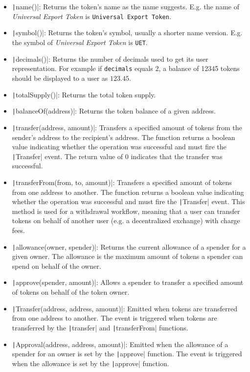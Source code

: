 \begin{itemize}
   \item \texttt|name()|: Returns the token's name as the name suggests. E.g. the name of \textit{Universal Export Token} is \texttt{Universal Export Token}.
   \item \texttt|symbol()|: Returns the token's symbol, usually a shorter name version. E.g. the symbol of \textit{Universal Export Token} is \texttt{UET}.
   \item \texttt|decimals()|: Returns the number of decimals used to get its user representation. For example if \texttt{decimals} equals $2$, a balance of 12345 tokens should be displayed to a user as $123.45$.
   \item \texttt|totalSupply()|: Returns the total token supply.
   \item \texttt|balanceOf(address)|: Returns the token balance of a given address.
   \item \texttt|transfer(address, amount)|: Transfers a specified amount of tokens from the sender's address to the recipient's address. The function returns a boolean
         value indicating whether the operation was successful and must fire the \texttt|Transfer| event. The return value of 0 indicates that the transfer was successful.
   \item \texttt|transferFrom(from, to, amount)|: Transfers a specified amount of tokens from one address to another. The function returns a boolean value
         indicating whether the operation was successful and must fire the \texttt|Transfer| event. This method is used for a withdrawal workflow,
         meaning that a user can transfer tokens on behalf of another user (e.g. a decentralized exchange) with charge fees.
   \item \texttt|allowance(owner, spender)|: Returns the current allowance of a spender for a given owner. The allowance is the maximum amount of tokens a spender can spend on behalf of the owner.
   \item \texttt|approve(spender, amount)|: Allows a spender to transfer a specified amount of tokens on behalf of the token owner.
   \item \texttt|Transfer(address, address, amount)|: Emitted when tokens are transferred from one address to another. The event is triggered when tokens are transferred by the \texttt|transfer| and \texttt|transferFrom| functions.
   \item \texttt|Approval(address, address, amount)|: Emitted when the allowance of a spender for an owner is set by the \texttt|approve| function. The event is triggered when the allowance is set by the \texttt|approve| function.
\end{itemize}

